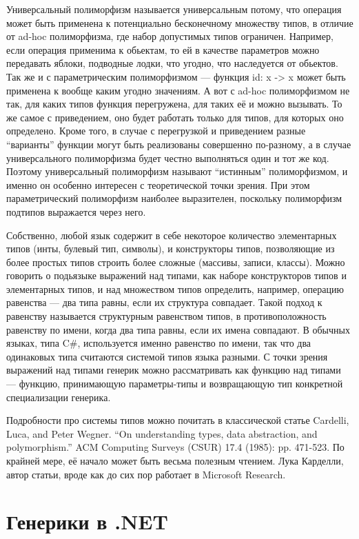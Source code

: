 \documentclass[a5paper]{article}
\begin{document}
Универсальный полиморфизм называется универсальным потому, что операция может быть применена к потенциально бесконечному множеству типов, в отличие от ad-hoc полиморфизма, где набор допустимых типов ограничен. Например, если операция применима к обьектам, то ей в качестве параметров можно передавать яблоки, подводные лодки, что угодно, что наследуется от обьектов. Так же и с параметрическим полиморфизмом --- функция id: x -> x может быть применена к вообще каким угодно значениям. А вот с ad-hoc полиморфизмом не так, для каких типов функция перегружена, для таких её и можно вызывать. То же самое с приведением, оно будет работать только для типов, для которых оно определено. Кроме того, в случае с перегрузкой и приведением разные ``варианты'' функции могут быть реализованы совершенно по-разному, а в случае универсального полиморфизма будет честно выполняться один и тот же код. Поэтому универсальный полиморфизм называют ``истинным'' полиморфизмом, и именно он особенно интересен с теоретической точки зрения. При этом параметрический полиморфизм наиболее выразителен, поскольку полиморфизм подтипов выражается через него.

Собственно, любой язык содержит в себе некоторое количество элементарных типов (инты, булевый тип, символы), и конструкторы типов, позволяющие из более простых типов строить более сложные (массивы, записи, классы). Можно говорить о подьязыке выражений над типами, как наборе конструкторов типов и элементарных типов, и над множеством типов определить, например, операцию равенства --- два типа равны, если их структура совпадает. Такой подход к равенству называется структурным равенством типов, в противоположность равенству по имени, когда два типа равны, если их имена совпадают. В обычных языках, типа C\#, используется именно равенство по имени, так что два одинаковых типа считаются системой типов языка разными. С точки зрения выражений над типами генерик можно рассматривать как функцию над типами --- функцию, принимающую параметры-типы и возвращающую тип конкретной специализации генерика.

Подробности про системы типов можно почитать в классической статье Cardelli, Luca, and Peter Wegner. ``On understanding types, data abstraction, and polymorphism.'' ACM Computing Surveys (CSUR) 17.4 (1985): pp. 471-523. По крайней мере, её начало может быть весьма полезным чтением. Лука Карделли, автор статьи, вроде как до сих пор работает в Microsoft Research.

\section{Генерики в .NET}
\end{document}
